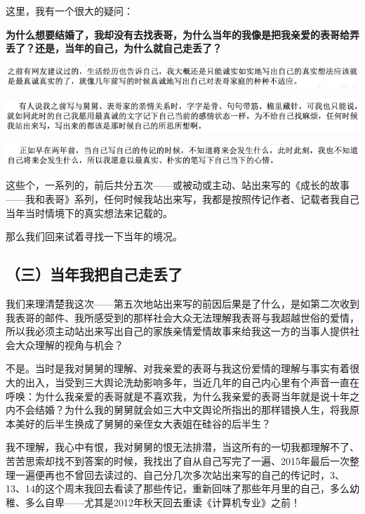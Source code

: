\documentclass[9pt, b5paper]{article}
\begin{document}
这里，我有一个很大的疑问：

\textbf{为什么想要结婚了，我却没有去找表哥，为什么当年的我像是把我亲爱的表哥给弄丢了？还是，当年的自己，为什么就自己走丢了？}

\begin{center}
\includegraphics[width=.9\linewidth]{./pic/backups_plans_20210426_112108.png}
\end{center}

\begin{center}
\includegraphics[width=.9\linewidth]{./pic/backups_plans_20210426_114722.png}
\end{center}

\begin{center}
\includegraphics[width=.9\linewidth]{./pic/backups_plans_20210426_114834.png}
\end{center}

这些个，一系列的，前后共分五次——或被动或主动、站出来写的《成长的故事——我和表哥》系列，任何时候我站出来写，我都是按照传记作者、记载者我自己当年当时情境下的真实想法来记载的。

那么我们回来试着寻找一下当年的境况。

\subsection{（三）当年我把自己走丢了}
\label{sec:orgc66ca89}

我们来理清楚我这次——第五次地站出来写的前因后果是了什么，是如第二次收到我表哥的邮件、我所感受到的那样社会大众无法理解我表哥与我超越世俗的爱情，所以我必须主动站出来写出自己的家族亲情爱情故事来给我这一方的当事人提供社会大众理解的视角与机会？

不是。当时是我对舅舅的理解、对我亲爱的表哥与我这份爱情的理解与事实有着很大的出入，当受到三大舆论洗劫影响多年，当近几年的自己内心里有个声音一直在呼唤：为什么我亲爱的表哥就是不喜欢我，为什么我亲爱的表哥当年就是说十年之内不会结婚？为什么我的舅舅就会如三大中文舆论所指出的那样错换人生，将我原本美好的后半生换成了舅舅的亲侄女大表姐在硅谷的后半生？

我不理解，我心中有恨，我对舅舅的恨无法排潜，当这所有的一切我都理解不了、苦苦思索却找不到答案的时候，我找出了自从自己写完了一遍、2015年最后一次整理一遍便再也不曾回去读过的、自己分几次多次站出来写的自己的传记时，3、13、14的这个周末我回去看读了那些传记，重新回味了那些年月里的自己，多么幼稚、多么自卑——尤其是2012年秋天回去重读《计算机专业》之前！
\end{document}
